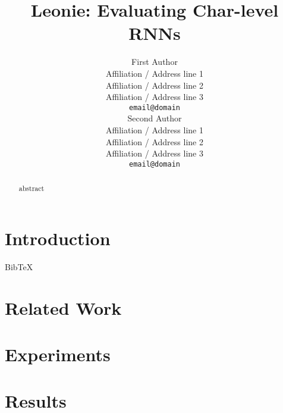 \documentclass[11pt]{article}
\title{Leonie: Evaluating Char-level RNNs}
\author{First Author \\
  Affiliation / Address line 1 \\
  Affiliation / Address line 2 \\
  Affiliation / Address line 3 \\
  {\tt email@domain} \\\And
  Second Author \\
  Affiliation / Address line 1 \\
  Affiliation / Address line 2 \\
  Affiliation / Address line 3 \\
  {\tt email@domain} \\}
\date{}
\newcommand\BibTeX{B{\sc ib}\TeX}
\begin{document}
\maketitle
\begin{abstract}
  abstract
\end{abstract}

\section{Introduction}
\BibTeX

\section{Related Work}
\label{sec:related}
\cite{Gusfield:97} %

\section{Experiments}

\section{Results}
\end{document}
